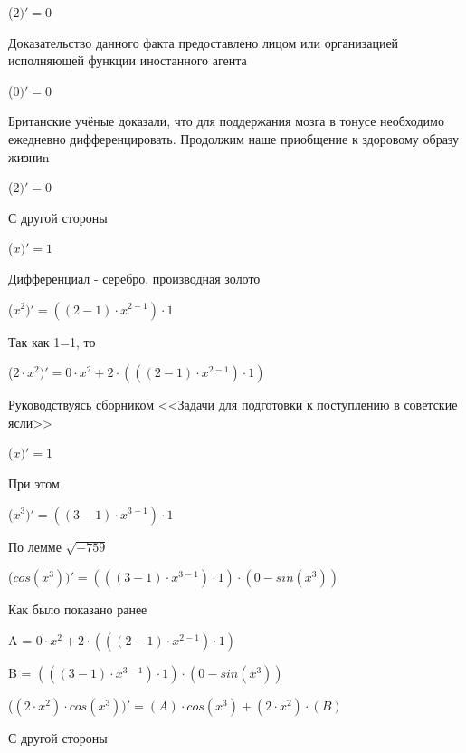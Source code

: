 \documentclass[12pt,a4paper,fleqn]{article}
\begin{document}
\begin{center}
 ($2)'
  = 0$\end{center}
Доказательство данного факта предоставлено лицом или организацией исполняющей функции иностанного агента

\begin{center}
 ($0)'
  = 0$\end{center}
Британские учёные доказали, что для поддержания мозга в тонусе необходимо ежедневно дифференцировать. Продолжим наше приобщение к здоровому образу жизниn

\begin{center}
 ($2)'
  = 0$\end{center}
С другой стороны

\begin{center}
 ($x)'
  = 1$\end{center}
Дифференциал - серебро, производная золото\cite{link2}

\begin{center}
 ($x^{2})'
  = ((2-1) \cdot x^{2-1}) \cdot 1$\end{center}
Так как 1=1, то\cite{link4}

\begin{center}
 ($2 \cdot x^{2})'
  = 0 \cdot x^{2}+2 \cdot (((2-1) \cdot x^{2-1}) \cdot 1)$\end{center}
Руководствуясь сборником <<Задачи для подготовки к поступлению в советские ясли>>\cite{link1}

\begin{center}
 ($x)'
  = 1$\end{center}
При этом

\begin{center}
 ($x^{3})'
  = ((3-1) \cdot x^{3-1}) \cdot 1$\end{center}
По лемме $\sqrt{-759}$
\begin{center}
 ($cos(x^{3}))'
  = (((3-1) \cdot x^{3-1}) \cdot 1) \cdot (0-sin(x^{3}))$\end{center}
Как было показано ранее

\begin{center}
A = $0 \cdot x^{2}+2 \cdot (((2-1) \cdot x^{2-1}) \cdot 1)$\end{center}
\begin{center}
B = $(((3-1) \cdot x^{3-1}) \cdot 1) \cdot (0-sin(x^{3}))$\end{center}
\begin{center}
 ($(2 \cdot x^{2}) \cdot cos(x^{3}))'
  = (A) \cdot cos(x^{3})+(2 \cdot x^{2}) \cdot (B)$\end{center}
С другой стороны
\end{document}
